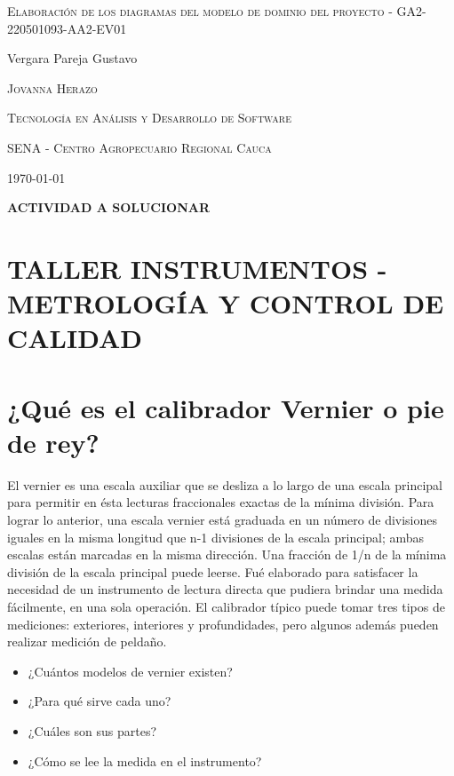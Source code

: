 \documentclass{article}
\author{Gustavo Vergara}
\theoremstyle{mytheoremstyle}
\theoremstyle{mytheoremstyle}
\theoremstyle{myproblemstyle}
\begin{document}
\pgfplotsset{compat=1.18}

\begin{titlepage}
	\centering
	\vspace{2.5cm}
	{\scshape \Large Elaboración de los diagramas del modelo de dominio del proyecto - GA2-220501093-AA2-EV01 \par}
	\vspace{5cm}
	\textbf\large\scshape{\par}
	\vspace{0.5cm}

	{\Large Vergara Pareja Gustavo\par}
	\vspace{5cm}
	{\scshape\Large Jovanna Herazo\par}
	\vspace{0.3cm}
	{\scshape\Large Tecnología en Análisis y Desarrollo de Software \par}
	\vspace{0.3cm}
	{\scshape\Large SENA - Centro Agropecuario Regional Cauca\par}
	\vspace{0.3cm}
	{\Large \today \par}
\end{titlepage}
\tableofcontents
\newpage

	\large \textbf{ACTIVIDAD A SOLUCIONAR}\\
	\vspace{0.1cm}
	\section*{TALLER INSTRUMENTOS - METROLOGÍA Y CONTROL DE CALIDAD}
\section{¿Qué es el calibrador Vernier o pie de rey?}
El vernier es una escala auxiliar que se desliza a lo largo de una escala principal para permitir en ésta lecturas fraccionales exactas de la mínima división. 
Para lograr lo anterior, una escala vernier está graduada en un número de divisiones iguales en la misma longitud que n-1 divisiones de la escala principal; ambas escalas están marcadas en la misma dirección. Una fracción de 1/n de la mínima división de la escala principal puede leerse. Fué elaborado para satisfacer la necesidad 
 de un instru­mento de lectura directa que pudiera brindar una medida fácilmente, en una sola 
 operación. El calibrador típico puede tomar tres tipos de mediciones: exteriores, 
 interiores y profundidades, pero algunos además pueden realizar medición de peldaño. 
	\begin{itemize}
		\item ¿Cuántos modelos de vernier existen?
		\item ¿Para qué sirve cada uno?
		\item ¿Cuáles son sus partes?
		\item ¿Cómo se lee la medida en el instrumento?
	\end{itemize}
\end{document}
